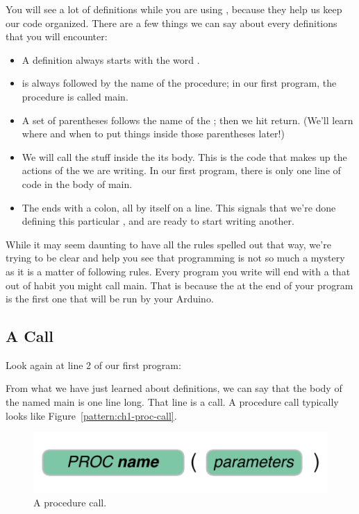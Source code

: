 \newpage

You will see a lot of \PROCedure definitions while you are using \plumbing, because they help us keep our code organized. There are a few things we can say about every \PROC definitions that you will encounter:

\begin{itemize}
	\item A \PROCedure definition always starts with the word \PROC. 
	\item \PROC is always followed by the name of the procedure; in our first program, the procedure is called {\code main}. 
	\item A set of parentheses follows the name of the \PROC; then we hit return. (We'll learn where and when to put things inside those parentheses later!) 
	\item We will call the stuff inside the \PROCedure its {\strong body}. This is the code that makes up the actions of the \PROC we are writing. In our first program, there is only one line of code in the body of {\code main}.
	\item The \PROC ends with a colon, all by itself on a line. This signals that we're done defining this particular \PROC, and are ready to start writing another.
\end{itemize}

While it may seem daunting to have all the rules spelled out that way, we're trying to be clear and help you see that programming is not so much a mystery as it is a matter of following rules. Every program you write will end with a \PROC that out of habit you might call {\code main}. That is because the \PROC at the end of your program is the first one that will be run by your Arduino. %

\subsection{A \PROCedure Call}
Look again at line 2 of our first program:



From what we have just learned about \PROC definitions, we can say that the body of the \PROC named {\code main} is one line long. That line is a \PROCedure call. A procedure call typically looks like Figure~\vref{pattern:ch1-proc-call}.

\begin{figure}[h!]
  \begin{center}
    \includegraphics[width=\linewidth]{images/ch1-proc-call-pattern}
    \caption{A procedure call.}
    \label{pattern:ch1-proc-call}
  \end{center}
\end{figure}

